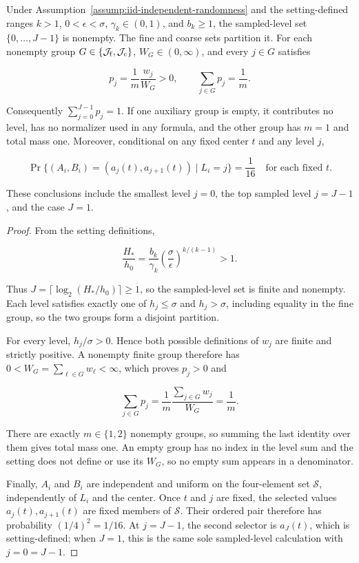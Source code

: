 \begin{lemma}\label{lem:step-008-level-offset-law}
Under Assumption~\ref{assump:iid-independent-randomness} and the setting-defined ranges \(k>1\), \(0<\epsilon<\sigma\), \(\gamma_k\in(0,1)\), and \(b_k\geq1\), the sampled-level set \(\{0,\ldots,J-1\}\) is nonempty. The fine and coarse sets partition it. For each nonempty group \(G\in\{\mathcal J_{\rm f},\mathcal J_{\rm c}\}\), \(W_G\in(0,\infty)\), and every \(j\in G\) satisfies

\[
p_j=\frac1m\frac{w_j}{W_G}>0,
\qquad
\sum_{j\in G}p_j=\frac1m.
\]

Consequently \(\sum_{j=0}^{J-1}p_j=1\). If one auxiliary group is empty, it contributes no level, has no normalizer used in any formula, and the other group has \(m=1\) and total mass one. Moreover, conditional on any fixed center \(t\) and any level \(j\),

\[
\Pr\{(A_i,B_i)=(a_j(t),a_{j+1}(t))\mid L_i=j\}=\frac1{16}
\quad\text{for each fixed }t.
\]

These conclusions include the smallest level \(j=0\), the top sampled level \(j=J-1\), and the case \(J=1\).
\end{lemma}

\begin{proof}
From the setting definitions,

\[
\frac{H_*}{h_0}
=\frac{b_k}{\gamma_k}
 \left(\frac{\sigma}{\epsilon}\right)^{k/(k-1)}>1.
\]

Thus \(J=\lceil\log_2(H_*/h_0)\rceil\geq1\), so the sampled-level set is finite and nonempty. Each level satisfies exactly one of \(h_j\leq\sigma\) and \(h_j>\sigma\), including equality in the fine group, so the two groups form a disjoint partition.

For every level, \(h_j/\sigma>0\). Hence both possible definitions of \(w_j\) are finite and strictly positive. A nonempty finite group therefore has \(0<W_G=\sum_{\ell\in G}w_\ell<\infty\), which proves \(p_j>0\) and

\[
\sum_{j\in G}p_j
=\frac1m\frac{\sum_{j\in G}w_j}{W_G}
=\frac1m.
\]

There are exactly \(m\in\{1,2\}\) nonempty groups, so summing the last identity over them gives total mass one. An empty group has no index in the level sum and the setting does not define or use its \(W_G\), so no empty sum appears in a denominator.

Finally, \(A_i\) and \(B_i\) are independent and uniform on the four-element set \(\mathcal S\), independently of \(L_i\) and the center. Once \(t\) and \(j\) are fixed, the selected values \(a_j(t),a_{j+1}(t)\) are fixed members of \(\mathcal S\). Their ordered pair therefore has probability \((1/4)^2=1/16\). At \(j=J-1\), the second selector is \(a_J(t)\), which is setting-defined; when \(J=1\), this is the same sole sampled-level calculation with \(j=0=J-1\).
\end{proof}

